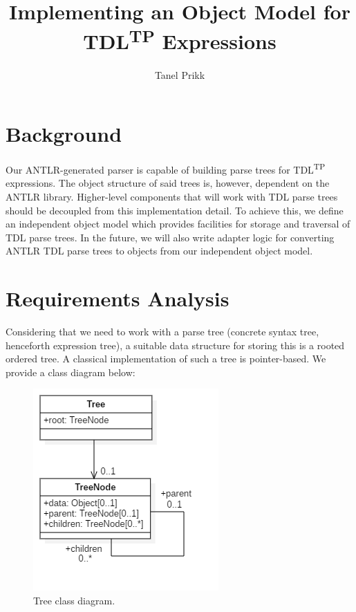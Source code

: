 \documentclass[12pt,oneside,a4paper,notitlepage]{report}
\title{
	Implementing an Object Model for TDL\textsuperscript{TP} Expressions
}
\author{Tanel Prikk}
\begin{document}
	\maketitle

	\section*{Background}
	\par Our ANTLR-generated parser is capable of building parse trees for TDL\textsuperscript{TP} expressions. The object structure of said trees is, however, dependent on the ANTLR library. Higher-level components that will work with TDL parse trees should be decoupled from this implementation detail. To achieve this, we define an independent object model which provides facilities for storage and traversal of TDL parse trees. In the future, we will also write adapter logic for converting ANTLR TDL parse trees to objects from our independent object model.

	\newpage

	\section*{Requirements Analysis}
	\par Considering that we need to work with a parse tree (concrete syntax tree, henceforth expression tree), a suitable data structure for storing this is a rooted ordered tree. A classical implementation of such a tree is pointer-based. We provide a class diagram below:

	\begin{figure}[h]
		\begin{center}
		\includegraphics{Models/BasicTree}
		\end{center}
		\caption{Tree class diagram.}
		\label{fig:basic-tree}
	\end{figure}
\end{document}
